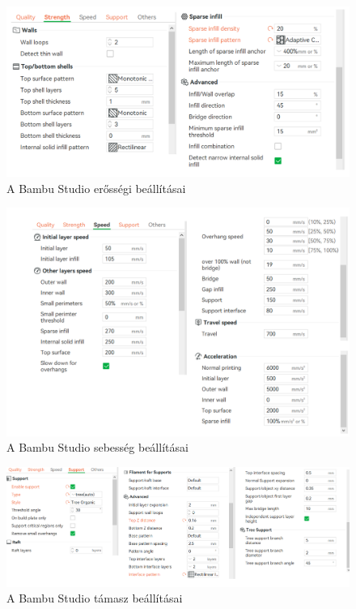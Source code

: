 \documentclass[12pt,a4paper]{article}
\begin{document}
\pagebreak

\begin{figure}[h!]
	\centering
	\includegraphics[width=1\linewidth]{fugg_slicer3}
	\caption{A Bambu Studio erősségi beállításai}

\end{figure}

\begin{figure}[h!]
	\centering
	\includegraphics[width=1\linewidth]{fugg_slicer4}
	\caption{A Bambu Studio sebesség beállításai}

\end{figure}

\begin{figure}[h!]
	\centering
	\includegraphics[width=1\linewidth]{fugg_slicer5}
	\caption{A Bambu Studio támasz beállításai}

\end{figure}
\end{document}
